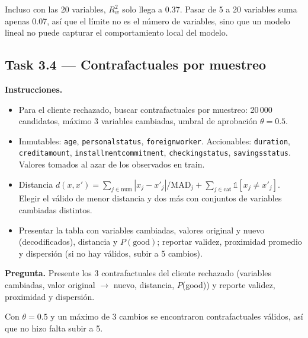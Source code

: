 \documentclass[11pt]{article}
\renewcommand{\_}{\textunderscore\allowbreak{}}
\begin{document}
Incluso con las 20 variables, \(R^2_w\) solo llega a 0.37. Pasar de 5 a 20 variables suma apenas 0.07, así que el límite no es el número de variables, sino que un modelo lineal no puede capturar el comportamiento local del modelo.

\subsection*{Task 3.4 --- Contrafactuales por muestreo}
\textbf{Instrucciones.}
\begin{itemize}
  \item Para el cliente rechazado, buscar contrafactuales por muestreo: 20\,000 candidatos, máximo 3 variables cambiadas, umbral de aprobación $\theta=0.5$.
  \item Inmutables: \texttt{age}, \texttt{personal\_status}, \texttt{foreign\_worker}. Accionables: \texttt{duration}, \texttt{credit\_amount}, \texttt{installment\_commitment}, \texttt{checking\_status}, \texttt{savings\_status}. Valores tomados al azar de los observados en train.
  \item Distancia $d(x,x')=\sum_{j\in\text{num}}|x_j-x'_j|/\mathrm{MAD}_j+\sum_{j\in\text{cat}}\mathbb 1[x_j\neq x'_j]$. Elegir el válido de menor distancia y dos más con conjuntos de variables cambiadas distintos.
  \item Presentar la tabla con variables cambiadas, valores original y nuevo (decodificados), distancia y $P(\text{good})$; reportar validez, proximidad promedio y dispersión (si no hay válidos, subir a 5 cambios).
\end{itemize}

\begin{tcolorbox}[colback=yellow!12, colframe=orange!70!black, boxrule=0.5pt, left=4pt, right=4pt]
\textbf{Pregunta.} Presente los 3 contrafactuales del cliente rechazado (variables cambiadas, valor original \(\rightarrow\) nuevo, distancia, \(P\)(good)) y reporte validez, proximidad y dispersión.
\end{tcolorbox}

Con \(\theta = 0.5\) y un máximo de 3 cambios se encontraron contrafactuales válidos, así que no hizo falta subir a 5.
\end{document}
